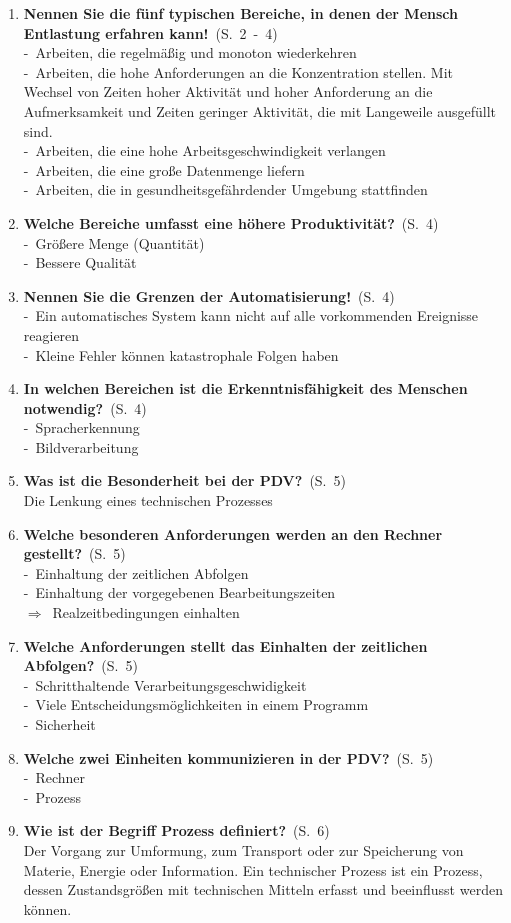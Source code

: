 \documentclass[a4paper,12pt]{article}
\newcommand{\question}[3]{\pagebreak[3]\item {\textbf{#1?}}\ (S.\ #2)#3}
\newcommand{\statement}[3]{\pagebreak[3]\item {\textbf{#1!}}\ (S.\ #2)#3}
\newcommand{\catchword}[1]{\\-\ #1}
\newcommand{\normaltext}[1]{\\#1}
\newcommand{\result}[1]{\\$\Rightarrow$\ #1}
\newcommand{\page}[1]{#1}
\newcommand{\pages}[2]{#1\ -\ #2}
\begin{document}
\begin{enumerate}
  \statement{Nennen Sie die fünf typischen Bereiche,
             in denen der Mensch Entlastung erfahren kann}{\pages{2}{4}}
  {
    \catchword{Arbeiten, die regelmäßig und monoton wiederkehren}
    \catchword{Arbeiten, die hohe Anforderungen an die Konzentration stellen. Mit Wechsel von Zeiten
               hoher Aktivität und hoher Anforderung an die Aufmerksamkeit und Zeiten geringer Aktivität,
               die mit Langeweile ausgefüllt sind.}
    \catchword{Arbeiten, die eine hohe Arbeitsgeschwindigkeit verlangen}
    \catchword{Arbeiten, die eine große Datenmenge liefern}
    \catchword{Arbeiten, die in gesundheitsgefährdender Umgebung stattfinden}
  }

  \question{Welche Bereiche umfasst eine höhere Produktivität}{\page{4}}
  {
    \catchword{Größere Menge (Quantität)}
    \catchword{Bessere Qualität}
  }

  \statement{Nennen Sie die Grenzen der Automatisierung}{\page{4}}
  {
    \catchword{Ein automatisches System kann nicht auf alle vorkommenden Ereignisse reagieren}
    \catchword{Kleine Fehler können katastrophale Folgen haben}
  }

  \question{In welchen Bereichen ist die Erkenntnisfähigkeit des Menschen notwendig}{\page{4}}
  {
    \catchword{Spracherkennung}
    \catchword{Bildverarbeitung}
  }

  \question{Was ist die Besonderheit bei der PDV}{\page{5}}
  {
    \normaltext{Die Lenkung eines technischen Prozesses}
  }

  \question{Welche besonderen Anforderungen werden an den Rechner gestellt}{\page{5}}
  {
    \catchword{Einhaltung der zeitlichen Abfolgen}
    \catchword{Einhaltung der vorgegebenen Bearbeitungszeiten}
    \result{Realzeitbedingungen einhalten}
  }

  \question{Welche Anforderungen stellt das Einhalten der zeitlichen Abfolgen}{\page{5}}
  {
    \catchword{Schritthaltende Verarbeitungsgeschwidigkeit}
    \catchword{Viele Entscheidungsmöglichkeiten in einem Programm}
    \catchword{Sicherheit}
  }

  \question{Welche zwei Einheiten kommunizieren in der PDV}{\page{5}}
  {
    \catchword{Rechner}
    \catchword{Prozess}
  }

  \question{Wie ist der Begriff Prozess definiert}{\page{6}}
  {
    \normaltext{Der Vorgang zur Umformung, zum Transport oder zur Speicherung von Materie, 
                Energie oder Information. Ein technischer Prozess ist ein Prozess, dessen
                Zustandsgrößen mit technischen Mitteln erfasst und beeinflusst werden können.}
  }


\end{enumerate}
\end{document}
